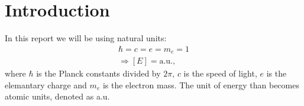 \section{Introduction}



In this report we will be using natural units:
\begin{align*}
\hbar = c = e = m_e = 1\\
\Rightarrow [E] = \mathrm{a.u.},
\end{align*}
where $\hbar$ is the Planck constants divided by $2\pi$, $c$ is the speed of light, $e$ is the elemantary charge and $m_e$ is the electron mass. The unit of energy than becomes atomic units, denoted as a.u.